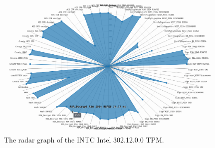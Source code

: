 \begin{landscape}
\begin{figure}[!t]
    \centering
    \includegraphics[width=\linewidth]{img/visualizations/INTC_Intel_302.12.0.0 radar graph.png}
    \caption{
    The radar graph of the INTC Intel 302.12.0.0 TPM.
    }
\end{figure}
\end{landscape}


